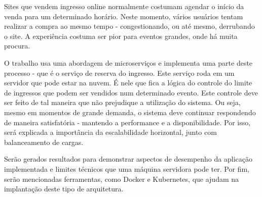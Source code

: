 
Sites que vendem ingresso online normalmente costumam agendar o início da venda
para um determinado horário.
Neste momento, vários usuários tentam realizar a compra ao mesmo tempo
- congestionando, ou até mesmo, derrubando o site.
A experiência costuma ser pior para eventos grandes, onde há muita procura.

O trabalho usa uma abordagem de microserviços e implementa uma parte deste
processo - que é o serviço de reserva do ingresso.
Este serviço roda em um servidor que pode estar na nuvem.
É nele que fica a lógica do controle do limite de ingressos que podem
ser vendidos num determinado evento.
Este controle deve ser feito de tal maneira que não prejudique a utilização
do sistema.
Ou seja, mesmo em momentos de grande demanda, o sistema deve continuar
respondendo de maneira satisfatória - mantendo a performance e a disponibilidade.
Por isso, será explicada a importância da escalabilidade horizontal,
junto com balanceamento de cargas.

Serão gerados resultados para demonstrar aspectos de desempenho da aplicação
implementada e limites técnicos que uma máquina servidora pode ter. Por fim,
serão mencionadas ferramentas, como Docker e Kubernetes, que ajudam na
implantação deste tipo de arquitetura.

